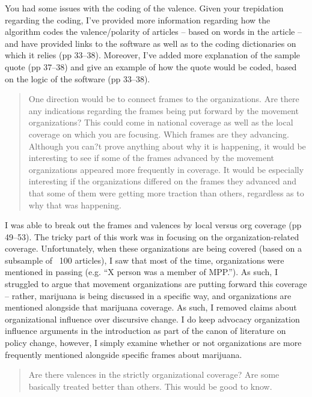 \documentclass[12pt,stdletter,dateno,sigleft]{newlfm} %
\begin{document}
\begin{newlfm}
You had some issues with the coding of the valence. Given your trepidation regarding the coding, I've provided more information regarding how the algorithm codes the valence/polarity of articles -- based on words in the article -- and have provided links to the software as well as to the coding dictionaries on which it relies (pp 33--38). Moreover, I've added more explanation of the sample quote (pp 37--38) and give an example of how the quote would be coded, based on the logic of the software (pp 33--38). 


\begin{quotation}{\color{red}\noindent \footnotesize
One direction would be to connect frames to the organizations.  Are there any indications regarding the frames being put forward by the movement organizations?  This could come in national coverage as well as the local coverage on which you are focusing.   Which frames are they advancing.  Although you can?t prove anything about why it is happening, it would be interesting to see if some of the frames advanced by the movement organizations appeared more frequently in coverage.   It would be especially interesting if the organizations differed on the frames they advanced and that some of them were getting more traction than others, regardless as to why that was happening.
}
\end{quotation}

I was able to break out the frames and valences by local versus org coverage (pp 49--53). The tricky part of this work was in focusing on the organization-related coverage. Unfortunately, when these organizations are being covered (based on a subsample of ~100 articles), I saw that most of the time, organizations were mentioned in passing (e.g. ``X person was a member of MPP.''). As such, I struggled to argue that movement organizations are putting forward this coverage -- rather, marijuana is being discussed in a specific way, and organizations are mentioned alongside that marijuana coverage. As such, I removed claims about organizational influence over discursive change. I do keep advocacy organization influence arguments in the introduction as part of the canon of literature on policy change, however, I simply examine whether or not organizations are more frequently mentioned alongside specific frames about marijuana. 




\begin{quotation}{\color{red}\noindent \footnotesize
Are there valences in the strictly organizational coverage?  Are some basically treated better than others.  This would be good to know.\newline

}
\end{quotation}
\end{newlfm}
\end{document}
